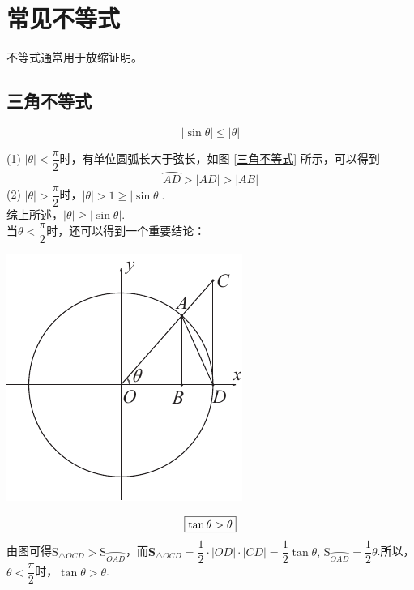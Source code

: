 \section{常见不等式}
不等式通常用于放缩证明。
\subsection{三角不等式}
\vspace*{-0.5em}
\begin{equation}
	\boxed{| \sin \theta | \le | \theta |}
\end{equation}
\noindent
\begin{minipage}{0.7\linewidth}
	\proof (1) \quad $|\theta| < \dfrac{\pi}{2}$时，有单位圆弧长大于弦长，如图 \ref{三角不等式} 所示，可以得到
	$$
	\wideparen{AD} > |AD| > |AB|
	$$
	(2) \quad $|\theta| > \dfrac{\pi}{2}$时，$|\theta| > 1 \ge |\sin \theta|.$\\[0.5em]
	综上所述，$|\theta| \ge |\sin \theta|$.\\[2em]
	\hspace*{2em} 当$\theta < \dfrac{\pi}{2}$时，还可以得到一个重要结论：
\end{minipage}\qquad
\begin{minipage}{0.25\linewidth}
	\centering
	\includegraphics[width = 0.9 \linewidth]{pic/C-F/三角不等式.pdf}
	\vspace*{-1em}
	\label{三角不等式}
\end{minipage}
\vspace*{0.5em}
\begin{equation}
		\boxed{\tan \theta > \theta}
		\vspace*{0.5em}
\end{equation}
\proof 由图可得$\displaystyle \text{S}_{\triangle OCD} > \text{S}_{\wideparen{OAD}}$，而$\textbf{S}_{\triangle OCD} = \dfrac{1}{2} \cdot |OD| \cdot |CD| = \dfrac{1}{2} \tan \theta, \,\text{S}_{\wideparen{OAD}} = \dfrac{1}{2} \theta$.所以，$\theta < \dfrac{\pi}{2}$时，$\tan \theta > \theta$.

